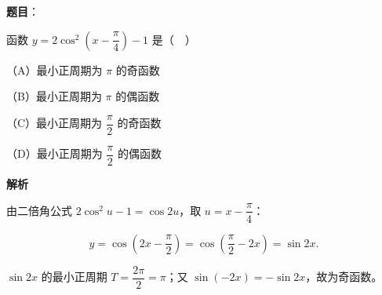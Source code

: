 \begin{answer}

\textbf{题目}：

函数 $y=2\cos^2\left(x-\dfrac{\pi}{4}\right)-1$ 是（　）

（A）最小正周期为 $\pi$ 的奇函数

（B）最小正周期为 $\pi$ 的偶函数

（C）最小正周期为 $\dfrac{\pi}{2}$ 的奇函数

（D）最小正周期为 $\dfrac{\pi}{2}$ 的偶函数

\textbf{解析}

由二倍角公式 $2\cos^2u-1=\cos2u$，取 $u=x-\dfrac{\pi}{4}$：

\nopagebreak[4]
\[y=\cos\left(2x-\frac{\pi}{2}\right)=\cos\left(\frac{\pi}{2}-2x\right)=\sin2x.\]

$\sin2x$ 的最小正周期 $T=\dfrac{2\pi}{2}=\pi$；又 $\sin(-2x)=-\sin2x$，故为奇函数。


\end{answer}
